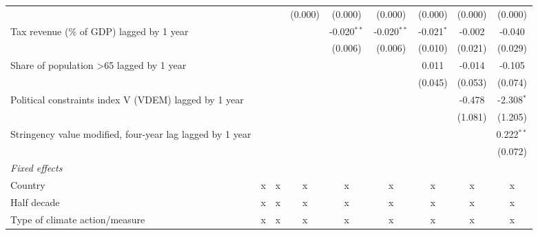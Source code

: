 \begin{tabular}{lcccccccc}
                                                             &               &               & (0.000)       & (0.000)        & (0.000)        & (0.000)       & (0.000)      & (0.000)\\   
   Tax revenue (\% of GDP) lagged by 1 year                  &               &               &               & -0.020$^{**}$  & -0.020$^{**}$  & -0.021$^{*}$  & -0.002       & -0.040\\   
                                                             &               &               &               & (0.006)        & (0.006)        & (0.010)       & (0.021)      & (0.029)\\   
   Share of population >65 lagged by 1 year                  &               &               &               &                &                & 0.011         & -0.014       & -0.105\\   
                                                             &               &               &               &                &                & (0.045)       & (0.053)      & (0.074)\\   
   Political constraints index V (VDEM) lagged by 1 year     &               &               &               &                &                &               & -0.478       & -2.308$^{*}$\\   
                                                             &               &               &               &                &                &               & (1.081)      & (1.205)\\   
   Stringency value modified, four-year lag lagged by 1 year &               &               &               &                &                &               &              & 0.222$^{**}$\\   
                                                             &               &               &               &                &                &               &              & (0.072)\\   
   \emph{Fixed effects}\\
   Country                                                   & x             & x             & x             & x              & x              & x             & x            & x\\  
   Half decade                                               & x             & x             & x             & x              & x              & x             & x            & x\\  
   Type of climate action/measure                            & x             & x             & x             & x              & x              & x             & x            & x\\  

\end{tabular}

